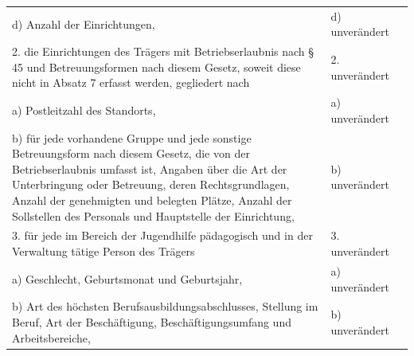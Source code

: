 \documentclass[10pt,a4paper,landscape]{article}
\begin{document}
\begin{longtable}{|L{8.2cm}|L{8.2cm}|L{8.2cm}|}
\hhline{|---|}
d)   \newline Anzahl der Einrichtungen, & d) unverändert &  \\
\hhline{|---|}
2. die Einrichtungen des Trägers mit  \newline Betriebserlaubnis nach \S{} 45 und  \newline Betreuungsformen nach diesem Gesetz,  \newline soweit diese nicht in Absatz 7 erfasst  \newline werden, gegliedert nach & 2. unverändert &  \\
\hhline{|---|}
a)   \newline Postleitzahl des Standorts, & a) unverändert &  \\
\hhline{|---|}
b)   \newline für jede vorhandene Gruppe und jede  \newline sonstige Betreuungsform nach diesem  \newline Gesetz, die von der Betriebserlaubnis  \newline umfasst ist, Angaben über die Art der  \newline Unterbringung oder Betreuung, deren  \newline Rechtsgrundlagen, Anzahl der  \newline genehmigten und belegten Plätze, Anzahl  \newline der Sollstellen des Personals und  \newline Hauptstelle der Einrichtung, & b) unverändert &  \\
\hhline{|---|}
3.   \newline für jede im Bereich der Jugendhilfe  \newline pädagogisch und in der Verwaltung tätige  \newline Person des Trägers & 3. unverändert &  \\
\hhline{|---|}
a)   \newline Geschlecht, Geburtsmonat und  \newline Geburtsjahr, & a) unverändert &  \\
\hhline{|---|}
b)   \newline Art des höchsten  \newline Berufsausbildungsabschlusses, Stellung im  \newline Beruf, Art der Beschäftigung,  \newline Beschäftigungsumfang und  \newline Arbeitsbereiche, & b) unverändert &  \\

\end{longtable}
\end{document}
